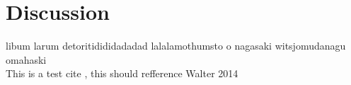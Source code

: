 \section{Discussion}\label{Sec:Discussion}
libum larum detoritidididadadad lalalamothumsto o nagasaki witsjomudanagu omahaski \\
This is a test cite \cite{Walter:2014}, this should refference Walter 2014